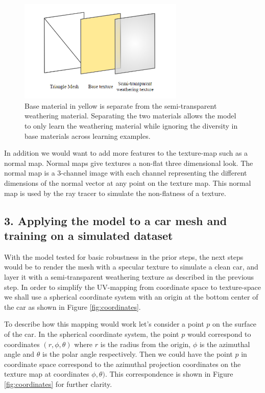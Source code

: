 \documentclass[letterpaper,doc,natbib]{apa6}
\begin{document}
\begin{figure}
\centering
\includegraphics[width=0.7\textwidth]{layers.png}
\caption{\label{fig:layers} Base material in yellow is separate from the semi-transparent weathering material. Separating the two materials allows the model to only learn the weathering material while ignoring the diversity in base materials across learning examples.}
\end{figure}

In addition we would want to add more features to the texture-map such as a normal map. Normal maps give textures a non-flat three dimensional look. The normal map is a 3-channel image with each channel representing the different dimensions of the normal vector at any point on the texture map. This normal map is used by the ray tracer to simulate the non-flatness of a texture.

\subsection{3. Applying the model to a car mesh and training on a simulated dataset}

With the model tested for basic robustness in the prior steps, the next steps would be to render the mesh with a specular texture to simulate a clean car, and layer it with a semi-transparent weathering texture as described in the previous step. In order to simplify the UV-mapping from coordinate space to texture-space we shall use a spherical coordinate system with an origin at the bottom center of the car as shown in Figure \ref{fig:coordinates}.

To describe how this mapping would work let's consider a point $p$ on the surface of the car. In the spherical coordinate system, the point $p$ would correspond to coordinates $(r, \phi, \theta)$ where $r$ is the radius from the origin, $\phi$ is the azimuthal angle and $\theta$ is the polar angle respectively. Then we could have the point $p$ in coordinate space correspond to the azimuthal projection coordinates on the texture map at coordinates $\phi, \theta)$. This correspondence is shown in Figure \ref{fig:coordinates} for further clarity.
\end{document}
